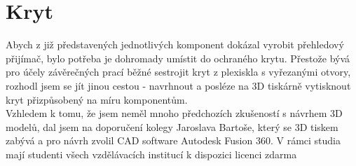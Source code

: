 \documentclass{ctuthesis}
\begin{document}
\section{Kryt}
Abych z již představených jednotlivých komponent dokázal vyrobit přehledový přijímač, bylo potřeba je dohromady umístit do ochraného krytu. Přestože bývá pro účely závěrečných prací běžné sestrojit kryt z plexiskla s vyřezanými otvory, rozhodl jsem se jít jinou cestou - navrhnout a posléze na 3D tiskárně vytisknout kryt přizpůsobený na míru komponentům. \\
Vzhledem k tomu, že jsem neměl mnoho předchozích zkušeností s návrhem 3D modelů, dal jsem na doporučení kolegy Jaroslava Bartoše, který se 3D tiskem zabývá a pro návrh zvolil CAD software Autodesk Fusion 360. V rámci studia mají studenti všech vzdělávacích institucí k dispozici licenci zdarma
\end{document}
